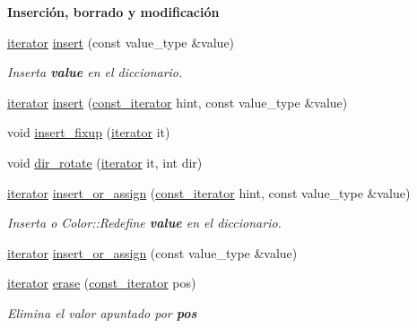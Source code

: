 \begin{Indent}{\bf \-Inserción, borrado y modificación}\par
\begin{DoxyCompactItemize}
\item 
\hyperlink{classaed2_1_1map_1_1iterator}{iterator} \hyperlink{classaed2_1_1map_a60aacba06b1579630b3c8e996cf248c8_a60aacba06b1579630b3c8e996cf248c8}{insert} (const value\-\_\-type \&value)
\begin{DoxyCompactList}\small\item\em \-Inserta {\bfseries value} en el diccionario. \end{DoxyCompactList}\item 
\hyperlink{classaed2_1_1map_1_1iterator}{iterator} \hyperlink{classaed2_1_1map_a6941cde9a79c27f054b5c97a587a1854_a6941cde9a79c27f054b5c97a587a1854}{insert} (\hyperlink{classaed2_1_1map_1_1const__iterator}{const\-\_\-iterator} hint, const value\-\_\-type \&value)
\item 
void \hyperlink{classaed2_1_1map_ac9197851fe5b217d45d58bbaf3612c75_ac9197851fe5b217d45d58bbaf3612c75}{insert\-\_\-fixup} (\hyperlink{classaed2_1_1map_1_1iterator}{iterator} it)
\item 
void \hyperlink{classaed2_1_1map_a94f2862ada0c9ed4f4457eac42ea8f23_a94f2862ada0c9ed4f4457eac42ea8f23}{dir\-\_\-rotate} (\hyperlink{classaed2_1_1map_1_1iterator}{iterator} it, int dir)
\item 
\hyperlink{classaed2_1_1map_1_1iterator}{iterator} \hyperlink{classaed2_1_1map_a2ef6723c183916276b0afc4a4c721475_a2ef6723c183916276b0afc4a4c721475}{insert\-\_\-or\-\_\-assign} (\hyperlink{classaed2_1_1map_1_1const__iterator}{const\-\_\-iterator} hint, const value\-\_\-type \&value)
\begin{DoxyCompactList}\small\item\em \-Inserta o \-Color\-::\-Redefine {\bfseries value} en el diccionario. \end{DoxyCompactList}\item 
\hyperlink{classaed2_1_1map_1_1iterator}{iterator} \hyperlink{classaed2_1_1map_a9128a806713bcc999ebd8a97ab77e765_a9128a806713bcc999ebd8a97ab77e765}{insert\-\_\-or\-\_\-assign} (const value\-\_\-type \&value)
\item 
\hyperlink{classaed2_1_1map_1_1iterator}{iterator} \hyperlink{classaed2_1_1map_ad8e796bf9c9c558e5ce6b61e116253fe_ad8e796bf9c9c558e5ce6b61e116253fe}{erase} (\hyperlink{classaed2_1_1map_1_1const__iterator}{const\-\_\-iterator} pos)
\begin{DoxyCompactList}\small\item\em \-Elimina el valor apuntado por {\bfseries pos} \end{DoxyCompactList}\item 

\end{DoxyCompactItemize}
\end{Indent}
